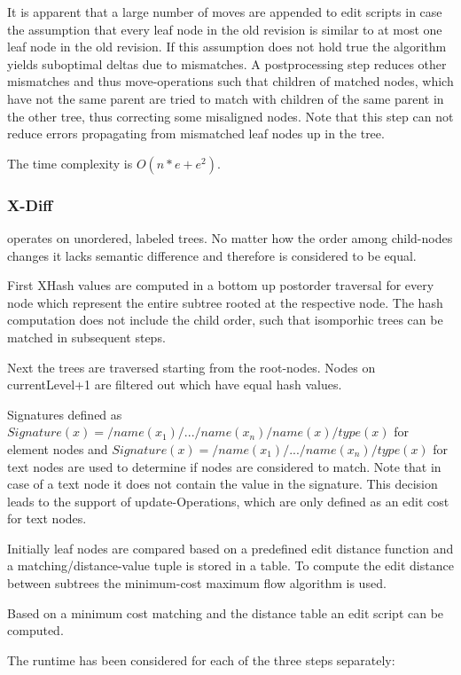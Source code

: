 It is apparent that a large number of moves are appended to edit scripts in case the assumption that every leaf node in the old revision is similar to at most one leaf node in the old revision. If this assumption does not hold true the algorithm yields suboptimal deltas due to mismatches. A postprocessing step reduces other mismatches and thus move-operations such that children of matched nodes, which have not the same parent are tried to match with children of the same parent in the other tree, thus correcting some misaligned nodes. Note that this step can not reduce errors propagating from mismatched leaf nodes up in the tree.

The time complexity is $O(n*e+e^2)$.

\subsubsection{X-Diff\cite{wang2003x}}
operates on unordered, labeled trees. No matter how the order among child-nodes changes it lacks semantic difference and therefore is considered to be equal. 

First XHash values are computed in a bottom up postorder traversal for every node which represent the entire subtree rooted at the respective node.
The hash computation does not include the child order, such that isomporhic trees can be matched in subsequent steps.

Next the trees are traversed starting from the root-nodes. Nodes on currentLevel+1 are filtered out which have equal hash values.

Signatures defined as $Signature(x) = /name(x_{1})/.../name(x_{n})/name(x)/type(x)$ for element nodes and $Signature(x) = /name(x_{1})/.../name(x_{n})/type(x)$ for text nodes are used to determine if nodes are considered to match. Note that in case of a text node it does not contain the value in the signature. This decision leads to the support of update-Operations, which are only defined as an edit cost for text nodes. 

Initially leaf nodes are compared based on a predefined edit distance function and a matching/distance-value tuple is stored in a table. To compute the edit distance between subtrees the minimum-cost maximum flow algorithm \cite{zhang1996constrained} is used.

Based on a minimum cost matching and the distance table an edit script can be computed.

The runtime has been considered for each of the three steps separately: 

